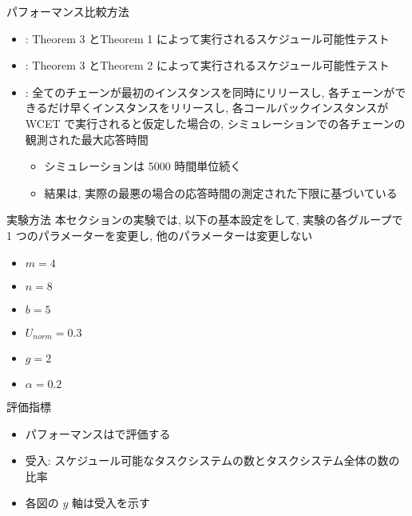 \begin{frame}{パフォーマンス比較方法}
    \begin{itemize}
        \item  {}: Theorem 3 とTheorem 1 によって実行されるスケジュール可能性テスト

        \item  {}: Theorem 3 とTheorem 2 によって実行されるスケジュール可能性テスト

        \item  {}: 全てのチェーンが最初のインスタンスを同時にリリースし, 各チェーンができるだけ早くインスタンスをリリースし, 各コールバックインスタンスが WCET で実行されると仮定した場合の, シミュレーションでの各チェーンの観測された最大応答時間
              \begin{itemize}
                  \item シミュレーションは 5000 時間単位続く
                  \item 結果は, 実際の最悪の場合の応答時間の測定された下限に基づいている
              \end{itemize}
    \end{itemize}
\end{frame}

\begin{frame}{実験方法}
    本セクションの実験では, 以下の基本設定をして, 実験の各グループで 1 つのパラメーターを変更し, 他のパラメーターは変更しない
    \begin{itemize}
        \item $m=4$
        \item $n=8$
        \item $b=5$
        \item $U_{n o r m}=0.3$
        \item $g=2$
        \item $\alpha=0.2$
    \end{itemize}
\end{frame}

\begin{frame}{評価指標}
    \begin{itemize}
        \item パフォーマンスはで評価する
        \item 受入: スケジュール可能なタスクシステムの数とタスクシステム全体の数の比率
        \item 各図の $y$ 軸は受入を示す
    \end{itemize}
\end{frame}

